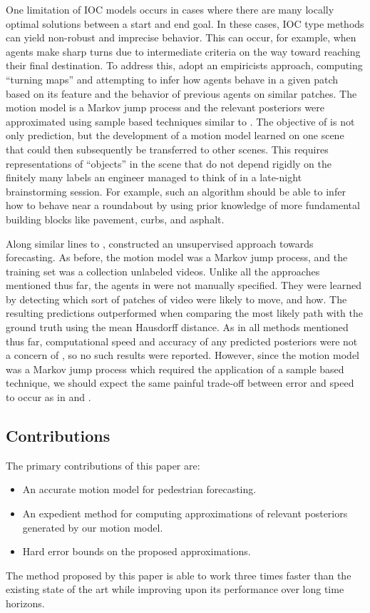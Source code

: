 \documentclass[letterpaper,10pt,conference]{ieeeconf}
\begin{document}
One limitation of IOC models occurs in cases where there are many locally optimal solutions between a start and end goal.
In these cases, IOC type methods can yield non-robust and imprecise behavior.
This can occur, for example, when agents make sharp turns due to intermediate criteria on the way toward reaching their final destination.
To address this, \cite{Ballan2016} adopt an empiricists approach, computing ``turning maps'' and attempting to infer how agents behave in a given patch based on its feature and the behavior of previous agents on similar patches.
The motion model is a Markov jump process and the relevant posteriors were approximated using sample based techniques similar to \cite{Karasev2016}.
The objective of \cite{Ballan2016} is not only prediction, but the development of a motion model learned on one scene that could then subsequently be transferred to other scenes. 
This requires representations of ``objects'' in the scene that do not depend rigidly on the finitely many labels an engineer managed to think of in a late-night brainstorming session.
For example, such an algorithm should be able to infer how to behave near a roundabout by using prior knowledge of more fundamental building blocks like pavement, curbs, and asphalt.

Along similar lines to \cite{Ballan2016}, \cite{Walker2014} constructed an unsupervised approach towards forecasting.
As before, the motion model was a Markov jump process, and the training set was a collection unlabeled videos.
Unlike all the approaches mentioned thus far, the agents in \cite{Walker2014} were not manually specified.
They were learned by detecting which sort of patches of video were likely to move, and how.
The resulting predictions outperformed \cite{Kitani2012} when comparing the most likely path with the ground truth using the mean Hausdorff distance.
As in all methods mentioned thus far, computational speed and accuracy of any predicted posteriors were not a concern of \cite{Walker2014}, so no such results were reported.
However, since the motion model was a Markov jump process which required the application of a sample based technique, we should expect the same painful trade-off between error and speed to occur as in \cite{Karasev2016} and \cite{Ballan2016}.

\subsection{Contributions}

The primary contributions of this paper are:
\begin{itemize}
	\item An accurate motion model for pedestrian forecasting.
	\item An expedient method for computing approximations of relevant posteriors generated by our motion model.
	\item Hard error bounds on the proposed approximations.
\end{itemize}
The method proposed by this paper is able to work three times faster than the existing state of the art while improving upon its performance over long time horizons.
\end{document}
